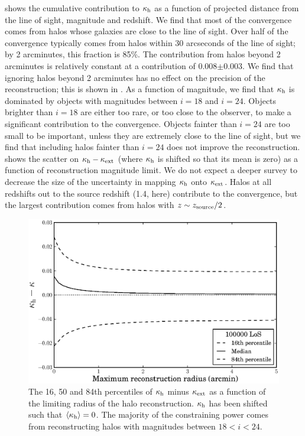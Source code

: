 \documentclass[useAMS,usenatbib]{mn2e}
\begin{document}
 shows the cumulative contribution to $\kappa_{\rm h}$ as a function
of projected distance from the line of sight, magnitude and redshift. We find
that most of the convergence comes from halos whose galaxies are close to the
line of sight.  Over half of the  convergence typically comes from halos
within 30 arcseconds of the line of sight; by 2 arcminutes, this fraction is
85\%. The contribution from halos beyond 2 arcminutes is relatively constant
at a contribution of 0.008$\pm$0.003. We find that ignoring halos beyond 2
arcminutes has no effect on the precision of the reconstruction; this is shown
in . As a function of magnitude, we find that $\kappa_{\rm h}$
is dominated by objects with magnitudes between $i=18$ and $i=24$. Objects
brighter than $i=18$ are either too rare, or too close to the observer, to
make a significant contribution to the convergence. Objects fainter than
$i=24$ are too small to be important, unless they are extremely close to the
line of sight, but we find that including halos fainter than $i=24$ does not
improve the reconstruction.   shows the scatter on
$\kappa_{\rm h}-\kappa_{\rm ext}$ (where $\kappa_{\rm h}$ is shifted so that its mean is zero) as a
function of reconstruction magnitude limit. We do
not expect a deeper survey to decrease the size of the uncertainty in mapping
$\kappa_{\rm h}$ onto $\kappa_{\rm ext}$. Halos at all redshifts out to the source redshift
(1.4, here) contribute to the convergence, but the largest contribution comes from
halos with $z \sim z_{\rm source}/2$.

\begin{figure}
\includegraphics[width=\columnwidth]{figs/radius_scatter.eps}
\caption[magcut]{The 16, 50 and 84th percentiles of $\kappa_{\rm h}$ minus
$\kappa_{\rm ext}$ as a function of the limiting radius of the halo
reconstruction. $\kappa_{\rm h}$ has been shifted such that
$\left\langle\kappa_{\rm h}\right\rangle=0$. The majority of the constraining power
comes from reconstructing halos with magnitudes between $18<i<24$.}
\label{fig:radcut}
\end{figure}
\end{document}

